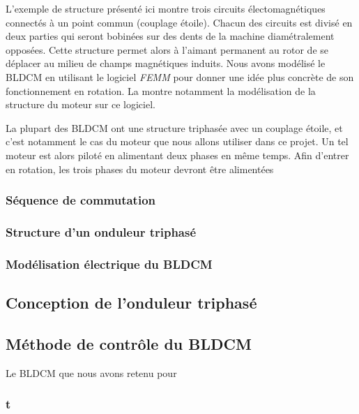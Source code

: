 \documentclass[a4paper,12pt]{report}
\begin{document}
				 L'exemple de structure présenté ici montre trois circuits électomagnétiques connectés à un point commun (couplage étoile). Chacun des circuits est divisé en deux parties qui seront bobinées sur des dents de la machine diamétralement opposées. Cette structure permet alors à l'aimant permanent au rotor de se déplacer au milieu de champs magnétiques induits. Nous avons modélisé le BLDCM en utilisant le logiciel \textit{FEMM} pour donner une idée plus concrète de son fonctionnement en rotation. La montre notamment la modélisation de la structure du moteur sur ce logiciel.
				 

				 La plupart des BLDCM ont une structure triphasée avec un couplage étoile, et c'est notamment le cas du moteur que nous allons utiliser dans ce projet. Un tel moteur est alors piloté en alimentant deux phases en même temps. Afin d'entrer en rotation, les trois phases du moteur devront être alimentées 
				 
				 \subsubsection{Séquence de commutation}
				 
				  
				 \subsubsection{Structure d'un onduleur triphasé}
				 
				 \subsubsection{Modélisation électrique du BLDCM}
				 
				 \subsection{Conception de l'onduleur triphasé}
				 
				 \subsection{Méthode de contrôle du BLDCM}
				 
				 Le BLDCM que nous avons retenu pour 
				 
				 	\subsubsection{t}
				 
\end{document}
